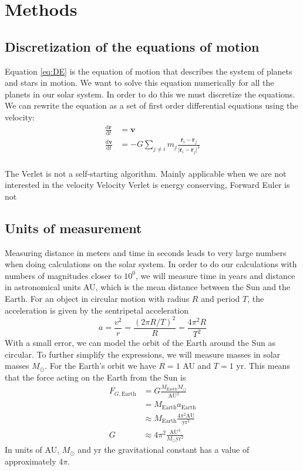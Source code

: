 \documentclass[reprint, english,notitlepage,nofootinbib]{revtex4-1}  %
\newcommand{\vc}[1]{\mathbf{#1}}
\begin{document}
\section{Methods}

\subsection{Discretization of the equations of motion}

Equation \ref{eq:DE} is the equation of motion that describes the system of planets and stars in motion. We want to solve this equation numerically for all the planets in our solar system. In order to do this we must discretize the equations. We can rewrite the equation as a set of first order differential equations using the velocity:
\begin{align*}
   \frac{\mathrm d \vc r}{\mathrm d t} &= \vc v \\
   \frac{\mathrm d \vc v}{\mathrm d t} &= - G \sum_{j \neq i} m_j \frac{\vc r_i - \vc r_j}{ \lvert \vc r_i - \vc r_j \rvert ^3}
\end{align*}
\\
The Verlet is not a self-starting algorithm.
Mainly applicable when we are not interested in the velocity
Velocity Verlet is energy conserving, Forward Euler is not


\subsection{Units of measurement}

Measuring distance in meters and time in seconds leads to very large numbers when doing calculations on the solar system. In order to do our calculations with numbers of magnitudes closer to $10^0$, we will measure time in years and distance in astronomical units AU, which is the mean distance between the Sun and the Earth. For an object in circular motion with radius $R$ and period $T$, the acceleration is given by the sentripetal acceleration
\begin{equation*}
  a = \frac{v^2}{r} = \frac{(2 \pi R / T)^2}{R} = \frac{4 \pi^2 R}{T^2}
\end{equation*}
With a small error, we can model the orbit of the Earth around the Sun as circular. To further simplify the expressions, we will measure masses in solar masses $M_\odot$. For the Earth's orbit we have $R = 1$ AU and $T = 1$ yr. This means that the force acting on the Earth from the Sun is
\begin{align*}
  F_{G, \text{Earth}} &= G \frac{M_{\text{Earth}} M_\odot}{\text{AU}^2} \\
  &= M_{\text{Earth}} a_{\text{Earth}} \\
  &\approx M_{\text{Earth}} \frac{4 \pi^2 \text{AU}}{\text{yr}^2} \\
  G &\approx 4 \pi^2 \frac{\text{AU}^3}{M_\odot \text{yr}^2}
\end{align*}
In units of AU, $M_\odot$ and yr the gravitational constant has a value of approximately $4 \pi$.
\end{document}
